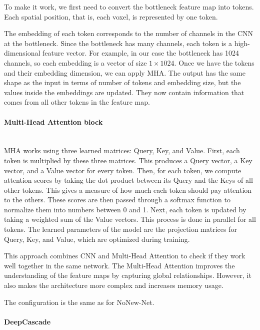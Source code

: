 \documentclass[12pt]{article}
\begin{document}
To make it work, we first need to convert the bottleneck feature map into tokens.
Each spatial position, that is, each voxel, is represented by one token.
\vspace{0.5cm}

The embedding of each token corresponds to the number of channels in the CNN at the bottleneck.
Since the bottleneck has many channels, each token is a high-dimensional feature vector.
For example, in our case the bottleneck has 1024 channels, so each embedding is a vector of size $1 \times 1024$.
Once we have the tokens and their embedding dimension, we can apply MHA.
The output has the same shape as the input in terms of number of tokens and embedding size, but the values inside the embeddings are updated. 
They now contain information that comes from all other tokens in the feature map.

\paragraph{Multi-Head Attention block}
\mbox{}\\

MHA works using three learned matrices: Query, Key, and Value.
First, each token is multiplied by these three matrices. This produces a Query vector, a Key vector, and a Value vector for every token.
Then, for each token, we compute attention scores by taking the dot product between its Query and the Keys of all other tokens.
This gives a measure of how much each token should pay attention to the others.
These scores are then passed through a softmax function to normalize them into numbers between 0 and 1.
Next, each token is updated by taking a weighted sum of the Value vectors. 
This process is done in parallel for all tokens. 
The learned parameters of the model are the projection matrices for Query, Key, and Value, which are optimized during training.
\vspace{0.5cm}

This approach combines CNN and Multi-Head Attention to check if they work well together in the same network.
The Multi-Head Attention improves the understanding of the feature maps by capturing global relationships. 
However, it also makes the architecture more complex and increases memory usage.
\vspace{0.5cm}

The configuration is the same as for NoNew-Net.

\paragraph{DeepCascade}
\mbox{}\\
\end{document}
